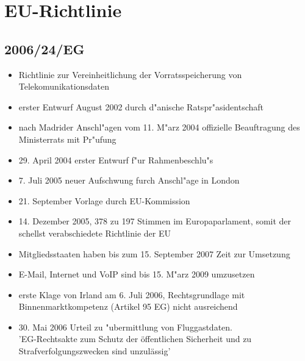 
\section{EU-Richtlinie}
  \subsection{2006/24/EG}
    \begin{frame}
      \begin{itemize}
        \item
          Richtlinie zur Vereinheitlichung der Vorratsspeicherung von Telekomunikationsdaten
        \item
          erster Entwurf August 2002 durch d"anische Ratspr"asidentschaft
        \item
          nach Madrider Anschl"agen vom 11. M"arz 2004 offizielle Beauftragung des Ministerrats mit Pr"ufung
        \item
          29. April 2004 erster Entwurf f"ur Rahmenbeschlu"s
        \item 
          7. Juli 2005 neuer Aufschwung furch Anschl"age in London
        \item
          21. September Vorlage durch EU-Kommission
        \item
          14. Dezember 2005, 378 zu 197 Stimmen im Europaparlament, somit der schellst verabschiedete Richtlinie der EU


      \end{itemize}
    \end{frame}

    \begin{frame}
      \begin{itemize}
        \item 
          Mitgliedsstaaten haben bis zum 15. September 2007 Zeit zur Umsetzung
        \item 
          E-Mail, Internet und VoIP sind bis 15. M"arz 2009 umzusetzen
        \item
          erste Klage von Irland am 6. Juli 2006, Rechtsgrundlage mit Binnenmarktkompetenz (Artikel 95 EG) nicht ausreichend
        \item
          30. Mai 2006 Urteil zu "ubermittlung von Fluggastdaten.\\
          'EG-Rechtsakte zum Schutz der öffentlichen Sicherheit und zu Strafverfolgungszwecken sind unzulässig'
      \end{itemize}
    \end{frame}

